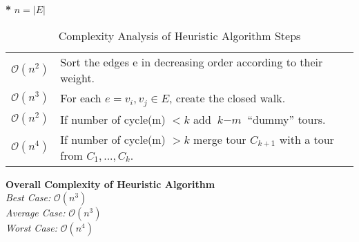 \documentclass{beamer}
\begin{document}
\begin{projectrequirements3}
    \begin{table}[!htbp]
    \begin{flushleft}
    \textbf{*} $n = |E|$
    \vspace*{0.15cm}
    \end{flushleft}
    \centering
    \begin{tabular}{| m{2cm} | m{8cm} |} 
        \hline
        \textbf{\centerline{Complexity}} & \textbf{\centerline{Algorithm Step}} \\
        \hline
        \hspace*{\fill} $\mathcal{O}(n^2)$ \hspace*{\fill} & Sort the edges e in decreasing order according to their weight.\\ 
        \hline
        \hspace*{\fill} $\mathcal{O}(n^3)$ \hspace*{\fill} & For each $e = {v_{i}, v_{j}} \in E $, create the closed walk.\\ 
        \hline
        \hspace*{\fill} $\mathcal{O}(n^2)$ \hspace*{\fill} & If number of cycle(m) $< k$ add $\textit{k} - \textit{m}$ “dummy” tours.\\ 
        \hline
        \hspace*{\fill} $\mathcal{O}(n^4)$ \hspace*{\fill} & If number of cycle(m) $> k$ merge tour $ C_{k+1} $ with a tour from $C_{1}, ... ,C_{k}$.\\ 
        \hline
    \end{tabular}
    \caption{\label{tab:heru}Complexity Analysis of Heuristic Algorithm Steps}
    \textbf{Overall Complexity of Heuristic Algorithm} \\
    \vspace{0.015\textheight}
\textit{Best Case:} $\mathcal{O}(n^3)$ \\
\textit{Average Case:} $\mathcal{O}(n^3)$ \\
\textit{Worst Case:} $\mathcal{O}(n^4)$ 
\end{table}

			    
\end{projectrequirements3}
\end{document}
